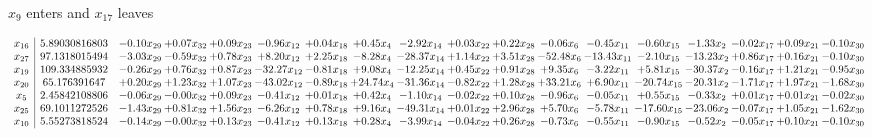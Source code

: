 \documentclass[9pt]{article}
\begin{document}
 $ x_{9} $ enters and $ x_{17} $ leaves 

 \[\begin{array}{c| c c@{\hskip 2pt} c@{\hskip 2pt} c@{\hskip 2pt} c@{\hskip 2pt} c@{\hskip 2pt} c@{\hskip 2pt} c@{\hskip 2pt} c@{\hskip 2pt} c@{\hskip 2pt} c@{\hskip 2pt} c@{\hskip 2pt} c@{\hskip 2pt} c@{\hskip 2pt} c@{\hskip 2pt} c@{\hskip 2pt} c@{\hskip 2pt} }
 x_{16}   &  5.89030816803 & -0.10 x_{29} & +  0.07 x_{32} & +  0.09 x_{23} & -0.96 x_{12} & +  0.04 x_{18} & +  0.45 x_{4} & -2.92 x_{14} & +  0.03 x_{22} & +  0.22 x_{28} & -0.06 x_{6} & -0.45 x_{11} & -0.60 x_{15} & -1.33 x_{2} & -0.02 x_{17} & +  0.09 x_{21} & -0.10 x_{30}\\
 x_{27}   &  97.1318015494 & -3.03 x_{29} & -0.59 x_{32} & +  0.78 x_{23} & +  8.20 x_{12} & +  2.25 x_{18} & -8.28 x_{4} & -28.37 x_{14} & +  1.14 x_{22} & +  3.51 x_{28} & -52.48 x_{6} & -13.43 x_{11} & -2.10 x_{15} & -13.23 x_{2} & +  0.86 x_{17} & +  0.16 x_{21} & -0.10 x_{30}\\
 x_{19}   &  109.334885932 & -0.26 x_{29} & +  0.76 x_{32} & +  0.87 x_{23} & -32.27 x_{12} & -0.81 x_{18} & +  9.08 x_{4} & -12.25 x_{14} & +  0.45 x_{22} & +  0.91 x_{28} & +  9.35 x_{6} & -3.22 x_{11} & +  5.81 x_{15} & -30.37 x_{2} & -0.16 x_{17} & +  1.21 x_{21} & -0.95 x_{30}\\
 x_{20}   &  65.176391647 & +  0.20 x_{29} & +  1.23 x_{32} & +  1.07 x_{23} & -43.02 x_{12} & -0.89 x_{18} & + 24.74 x_{4} & -31.36 x_{14} & -0.82 x_{22} & +  1.28 x_{28} & + 33.21 x_{6} & +  6.90 x_{11} & -20.74 x_{15} & -20.31 x_{2} & -1.71 x_{17} & +  1.97 x_{21} & -1.68 x_{30}\\
 x_{5}   &  2.45842108806 & -0.06 x_{29} & -0.00 x_{32} & +  0.09 x_{23} & -0.41 x_{12} & +  0.01 x_{18} & +  0.42 x_{4} & -1.10 x_{14} & -0.02 x_{22} & +  0.10 x_{28} & -0.96 x_{6} & -0.05 x_{11} & +  0.55 x_{15} & -0.33 x_{2} & +  0.01 x_{17} & +  0.01 x_{21} & -0.02 x_{30}\\
 x_{25}   &  69.1011272526 & -1.43 x_{29} & +  0.81 x_{32} & +  1.56 x_{23} & -6.26 x_{12} & +  0.78 x_{18} & +  9.16 x_{4} & -49.31 x_{14} & +  0.01 x_{22} & +  2.96 x_{28} & +  5.70 x_{6} & -5.78 x_{11} & -17.60 x_{15} & -23.06 x_{2} & -0.07 x_{17} & +  1.05 x_{21} & -1.62 x_{30}\\
 x_{10}   &  5.55273818524 & -0.14 x_{29} & -0.00 x_{32} & +  0.13 x_{23} & -0.41 x_{12} & +  0.13 x_{18} & +  0.28 x_{4} & -3.99 x_{14} & -0.04 x_{22} & +  0.26 x_{28} & -0.73 x_{6} & -0.55 x_{11} & -0.90 x_{15} & -0.52 x_{2} & -0.05 x_{17} & +  0.10 x_{21} & -0.10 x_{30}\\

\end{array}\]
\end{document}
